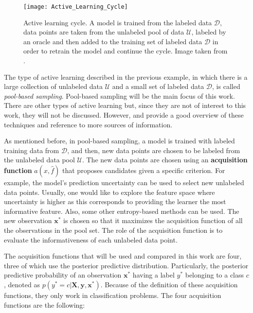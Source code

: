 \begin{figure}[H]
    \centering
    \texttt{[image: Active\_Learning\_Cycle]}
    \caption{Active learning cycle. A model is trained from the labeled data $\mathcal{D}$, data points are taken from the unlabeled pool of data $\mathcal{U}$, labeled by an oracle and then added to the training set of labeled data $\mathcal{D}$ in order to retrain the model and continue the cycle. Image taken from \cite{settles.tr09}.}
    \label{fig:Active_Learning_Cycle}
\end{figure}

The type of active learning described in the previous example, in which there is a large collection of unlabeled data $\mathcal{U}$ and a small set of labeled data $\mathcal{D}$, is called \textit{pool-based sampling}. Pool-based sampling will be the main focus of this work. There are other types of active learning but, since they are not of interest to this work, they will not be discussed. However, \cite{olsson2009literature} and \cite{settles.tr09} provide a good overview of these techniques and reference to more sources of information.

As mentioned before, in pool-based sampling, a model is trained with labeled training data from $\mathcal{D}$, and then, new data points are chosen to be labeled from the unlabeled data pool $\mathcal{U}$. The new data points are chosen using an \textbf{acquisition function} $a(x, \hat{f})$
that proposes candidates given a specific criterion. For example, the model's prediction uncertainty can be used to select new unlabeled data points. Usually, one would like to explore the feature space where uncertainty is higher as this corresponds to providing the learner the most informative feature. Also, some other entropy-based methods can be used. The new observation $\boldsymbol{x}^*$ is chosen so that it maximizes the acquisition function of all the observations in the pool set. The role of the acquisition function is to evaluate the informativeness of each unlabeled data point.

The acquisition functions that will be used and compared in this work are four, three of which use the posterior predictive distribution. Particularly, the posterior predictive probability of an observation $\boldsymbol{x}^*$ having a label $y^*$ belonging to a class $c$, denoted as $p(y^* = c | \boldsymbol{X}, \boldsymbol{y}, \boldsymbol{x}^*)$. Because of the definition of these acquisition functions, they only work in classification problems. The four acquisition functions are the following:

